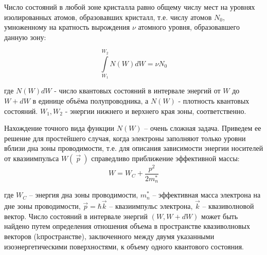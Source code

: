 		Число состояний в любой зоне кристалла равно общему числу мест на уровнях изолированных атомов, образовавших кристалл,
		т.е. числу атомов $N_0$, умноженному на кратность вырождения $\nu$ атомного уровня, образовавшего данную зону:
		
		\begin{equation}
		\int \limits_{W_1}^{W_2} N(W) dW  =\nu N_0 
		\label{eq:2.1}
		\end{equation} 
		
		где $N(W)dW$ - число  квантовых состояний в интервале энергий от $W$ до $W+dW$ в единице объёма полупроводника, а $N(W)$
		-  плотность квантовых состояний. $W_1,W_2$ - энергии нижнего и верхнего края зоны, соответственно. 
		
		Нахождение точного вида функции $N(W)$ – очень сложная задача. Приведем ее решение для простейшего случая, когда электроны
		заполняют только уровни вблизи дна зоны проводимости, т.е. для описания зависимости энергии носителей от квазиимпульса
		$W(~\vec{p}~)$ справедливо приближение эффективной массы:   
		\begin{equation}
		W = W_C + \frac{p^2}{2m_n^*}
		\label{eq:2.2}
		\end{equation}
		
		где $W_C$ – энергия дна зоны проводимости, $m_n^*$ –  эффективная масса электрона на дне зоны проводимости, $\vec{p} =
		\hbar \vec{k}$ – квазиимпульс электрона, $\vec{k}$ – квазиволновой вектор. Число состояний в интервале энергий $(W, W+dW)$ может быть найдено
		путем определения отношения объема в пространстве квазиволновых векторов (kпространстве), заключенного между двумя
		указанными изоэнергетическими поверхностями, к объему одного квантового состояния. 
		
